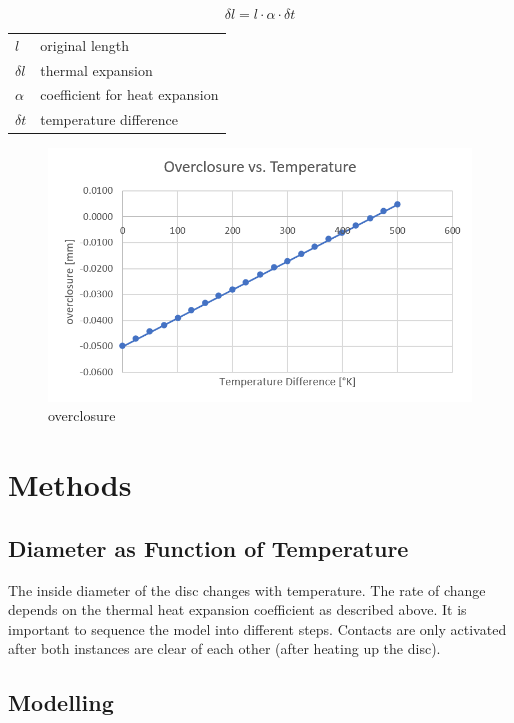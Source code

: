\documentclass[12pt]{article}
\makeatletter
\newenvironment{conditions}
  {\par\vspace{\abovedisplayskip}\noindent\begin{tabular}{>{$}l<{$} @{${}={}$} l}}
  {\end{tabular}\par\vspace{\belowdisplayskip}}
\makeatother
\begin{document}
\begin{equation}\label{eq:1}
  \delta l = l \cdot \alpha \cdot \delta t
\end{equation}
\begin{conditions}
  l         &  original length\\
  \delta l  &  thermal expansion\\
  \alpha    &  coefficient for heat expansion\\
  \delta t  &  temperature difference
\end{conditions}

\begin{figure}[!htb]
  \centering
  \includegraphics[width=0.9\linewidth]{pics/overclosure_temperature}
 \caption{overclosure}
  \label{fig:1}
\end{figure}



\newpage
\section{Methods}

\subsection{Diameter as Function of Temperature}

The inside diameter of the disc changes with temperature. The rate of change 
depends on the thermal heat expansion coefficient as described above. 
It is important to sequence the model into different steps. 
Contacts are only activated after both
instances are clear of each other (after heating up the disc).




\subsection{Modelling}
\end{document}

